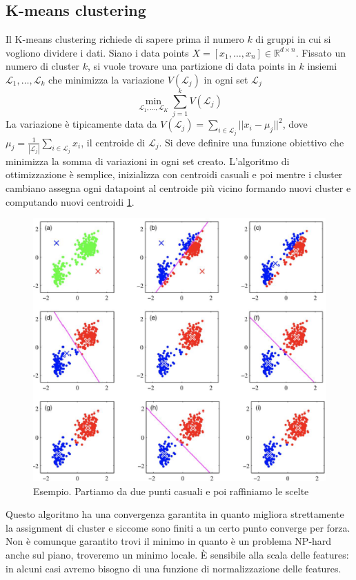 \subsection{K-means clustering}
Il K-means clustering richiede di sapere prima il numero $k$ di gruppi in cui si vogliono dividere i dati.
Siano i data points $X=[x_1,\dots,x_n]\in\mathbb{R}^{d\times n}$.
Fissato un numero di cluster $k$, si vuole trovare una partizione di data points in $k$ insiemi $\mathcal{L}_1,\dots,\mathcal{L}_k$ che minimizza la variazione $V(\mathcal{L}_j)$ in ogni set $\mathcal{L}_j$
$$\min\limits_{\mathcal{L}_1,\dots,\mathcal{L}_K}\sum\limits_{j = 1}^kV(\mathcal{L}_j)$$
La variazione \`e tipicamente data da $V(\mathcal{L}_j) = \sum\limits_{i\in\mathcal{L}_j}||x_i-\mu_j||^2$, dove $\mu_j = \frac{1}{|\mathcal{L}_j|}\sum\limits_{i\in\mathcal{L}_j}x_i$, il centroide di $\mathcal{L}_j$.
Si deve definire una funzione obiettivo che minimizza la somma di variazioni in ogni set creato.
L'algoritmo di ottimizzazione \`e semplice, inizializza con centroidi casuali e poi mentre i cluster cambiano assegna ogni datapoint al centroide pi\`u vicino formando nuovi cluster e computando nuovi centroidi \ref{fig:chapter12-11}.
\begin{figure}
	\centering
	\includegraphics[width=0.6\linewidth]{imgs/chapter12/img11}
	\caption{Esempio. Partiamo da due punti casuali e poi raffiniamo le scelte}
	\label{fig:chapter12-11}
\end{figure}

Questo algoritmo ha una convergenza garantita in quanto migliora strettamente la assignment di cluster e siccome sono finiti a un certo punto converge per forza.
Non \`e comunque garantito trovi il minimo in quanto \`e un problema NP-hard anche sul piano, troveremo un minimo locale.
\`E sensibile alla scala delle features: in alcuni casi avremo bisogno di una funzione di normalizzazione delle features.

